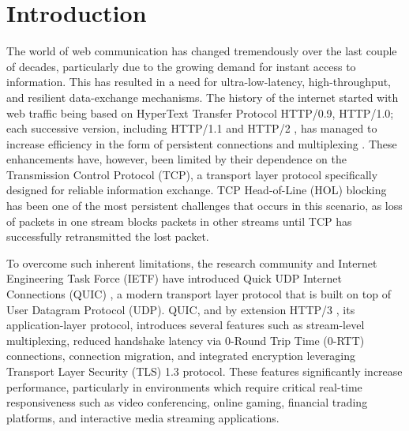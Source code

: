 




\chapter{Introduction}
\label{chap\:Introduction}

The world of web communication has changed tremendously over the last couple of decades, particularly due to the growing demand for instant access to information. This has resulted in a need for ultra-low-latency, high-throughput, and resilient data-exchange mechanisms. The history of the internet started with web traffic being based on HyperText Transfer Protocol HTTP/0.9, HTTP/1.0; each successive version, including HTTP/1.1 and HTTP/2 \cite{rfc7540}, has managed to increase efficiency in the form of persistent connections and multiplexing \cite{kurose2017}. These enhancements have, however, been limited by their dependence on the Transmission Control Protocol (TCP), a transport layer protocol specifically designed for reliable information exchange. TCP Head-of-Line (HOL) blocking has been one of the most persistent challenges that occurs in this scenario, as loss of packets in one stream blocks packets in other streams until TCP has successfully retransmitted the lost packet.

To overcome such inherent limitations, the research community and Internet Engineering Task Force (IETF) have introduced Quick UDP Internet Connections (QUIC) \cite{rfc9000}, a modern transport layer protocol that is built on top of User Datagram Protocol (UDP). QUIC, and by extension HTTP/3 \cite{rfc9114}, its application-layer protocol, introduces several features such as stream-level multiplexing, reduced handshake latency via 0-Round Trip Time (0-RTT) connections, connection migration, and integrated encryption leveraging Transport Layer Security (TLS) 1.3 protocol. These features significantly increase performance, particularly in environments which require critical real-time responsiveness such as video conferencing, online gaming, financial trading platforms, and interactive media streaming applications.

